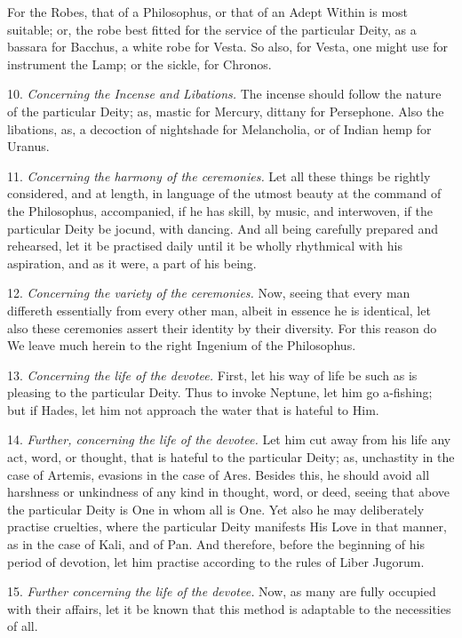 For the Robes, that of a Philosophus, or that of an Adept Within is most suitable; or, the robe best fitted for the service of the particular Deity, as a bassara for Bacchus, a white robe for Vesta. So also, for Vesta, one might use for instrument the Lamp; or the sickle, for Chronos.

10. \textit{Concerning the Incense and Libations.} The incense should follow the nature of the particular Deity; as, mastic for Mercury, dittany for Persephone. Also the libations, as, a decoction of nightshade for Melancholia, or of Indian hemp for Uranus.

11. \textit{Concerning the harmony of the ceremonies.} Let all these things be rightly considered, and at length, in language of the utmost beauty at the command of the Philosophus, accompanied, if he has skill, by music, and interwoven, if the particular Deity be jocund, with dancing. And all being carefully prepared and rehearsed, let it be practised daily until it be wholly rhythmical with his aspiration, and as it were, a part of his being.

12. \textit{Concerning the variety of the ceremonies.} Now, seeing that every man differeth essentially from every other man, albeit in essence he is identical, let also these ceremonies assert their identity by their diversity. For this reason do We leave much herein to the right Ingenium of the Philosophus.

13. \textit{Concerning the life of the devotee.} First, let his way of life be such as is pleasing to the particular Deity. Thus to invoke Neptune, let him go a-fishing; but if Hades, let him not approach the water that is hateful to Him.

14. \textit{Further, concerning the life of the devotee.} Let him cut away from his life any act, word, or thought, that is hateful to the particular Deity; as, unchastity in the case of Artemis, evasions in the case of Ares. Besides this, he should avoid all harshness or unkindness of any kind in thought, word, or deed, seeing that above the particular Deity is One in whom all is One. Yet also he may deliberately practise cruelties, where the particular Deity manifests His Love in that manner, as in the case of Kali, and of Pan. And therefore, before the beginning of his period of devotion, let him practise according to the rules of Liber Jugorum.

15. \textit{Further concerning the life of the devotee.} Now, as many are fully occupied with their affairs, let it be known that this method is adaptable to the necessities of all.

